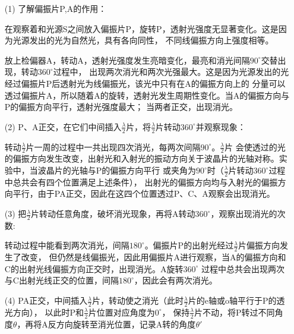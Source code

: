 \documentclass{article}
\newcommand{\degree}{^\circ}
\begin{document}
    \begin{itemize}
        \item [(1)]
        了解偏振片P,A的作用：

        在观察着和光源S之间放入偏振片P，旋转P，透射光强度无显著变化。这是因为光源发出的光为自然光，具有各向同性，
        不同线偏振方向上强度相等。

        放上检偏器A，转动A，透射光强度发生亮暗变化，最亮和消光间隔$90\degree$交替出现，转动$360\degree$过程中，
        出现两次消光和两次光强最大。这是因为光源发出的光经过偏振片P后透射光为线偏振光，该光中只有在A的偏振方向上的
        分量可以透过偏振片A，所以随着A的旋转，透射光发生周期性变化。当A的偏振方向与P的偏振方向平行，透射光强度最大；
        当两者正交，出现消光。

        \item [(2)]
        P、A正交，在它们中间插入$\frac{\lambda}{2}$片，将$\frac{\lambda}{2}$片转动$360\degree$并观察现象：

        转动$\frac{\lambda}{2}$片一周的过程中一共出现四次消光，每两次间隔$90\degree$。$\frac{\lambda}{2}$片
        会使透过的光的偏振方向发生改变，出射光和入射光的振动方向关于波晶片的光轴对称。实验中，当波晶片的光轴与P的偏振方向平行
        或夹角为$90\degree$时（$\frac{\lambda}{2}$片转动$360\degree$过程中总共会有四个位置满足上述条件），
        出射光的偏振方向均与入射光的偏振方向平行，由于PA正交，因此在这四个位置透过P、C、A观察会出现消光。

        \item [(3)]
        把$\frac{\lambda}{2}$片转动任意角度，破坏消光现象，再将A转动$360\degree$，观察出现消光的次数:

        转动过程中能看到两次消光，间隔$180\degree$。偏振片P的出射光经过$\frac{\lambda}{2}$片偏振方向发生了改变，
        但仍然是线偏振光，因此用偏振片A进行观察，当A的偏振方向和C的出射光线偏振方向正交时，出现消光。A旋转$360\degree$
        过程中总共会出现两次与C出射光线正交的位置，间隔$180\degree$，因此会有两次消光。

        \item [(4)]
        PA正交，中间插入$\frac{\lambda}{2}$片，转动使之消光（此时$\frac{\lambda}{2}$片的e轴或o轴平行于P的透光方向），
        以此时P和$\frac{\lambda}{2}$片位置对应角度为$0\degree$，
        保持$\frac{\lambda}{2}$片不动，将P转过不同角度$\theta$，再将A反方向旋转至消光位置，记录A转的角度$\theta '$


\end{itemize}
\end{document}
